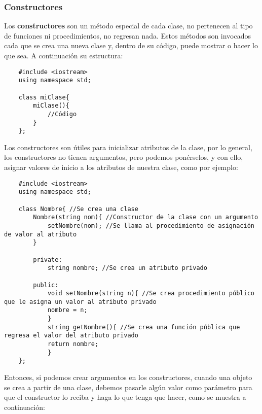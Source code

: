 \subsubsection{Constructores}
Los \textbf{constructores} son un método especial de cada clase, no pertenecen al tipo de funciones ni procedimientos, no regresan nada. Estos métodos son invocados cada que se crea una nueva clase y, dentro de su código, puede mostrar o hacer lo que sea. A continuación su estructura:
\begin{lstlisting}
    #include <iostream>
    using namespace std;
    
    class miClase{
        miClase(){
            //Código
        }
    };
\end{lstlisting}
Los constructores son útiles para inicializar atributos de la clase, por lo general, los constructores no tienen argumentos, pero podemos ponérselos, y con ello, asignar valores de inicio a los atributos de nuestra clase, como por ejemplo:
\begin{lstlisting}
    #include <iostream>
    using namespace std;

    class Nombre{ //Se crea una clase
        Nombre(string nom){ //Constructor de la clase con un argumento
            setNombre(nom); //Se llama al procedimiento de asignación de valor al atributo
        }
        
        private:
            string nombre; //Se crea un atributo privado
        
        public:
            void setNombre(string n){ //Se crea procedimiento público que le asigna un valor al atributo privado
            nombre = n;
            }
            string getNombre(){ //Se crea una función pública que regresa el valor del atributo privado
            return nombre;
            }
    };
\end{lstlisting}
Entonces, si podemos crear argumentos en los constructores, cuando una objeto se crea a partir de una clase, debemos pasarle algún valor como parámetro para que el constructor lo reciba y haga lo que tenga que hacer, como se muestra a continuación:
